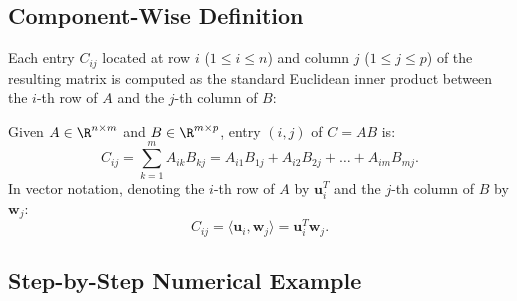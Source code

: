 \subsection{Component-Wise Definition}

Each entry $C_{ij}$ located at row $i$ ($1 \le i \le n$) and column $j$ ($1 \le j \le p$) of the resulting matrix is computed as the standard Euclidean inner product between the $i$-th row of $A$ and the $j$-th column of $B$:

\begin{definition}
Given $A \in \R^{n \times m}$ and $B \in \R^{m \times p}$, entry $(i, j)$ of $C = AB$ is:
\begin{equation}
    C_{ij} = \sum_{k=1}^m A_{ik} B_{kj} = A_{i1}B_{1j} + A_{i2}B_{2j} + \dots + A_{im}B_{mj}.
\end{equation}
In vector notation, denoting the $i$-th row of $A$ by $\mathbf{u}_i^T$ and the $j$-th column of $B$ by $\mathbf{w}_j$:
\begin{equation}
    C_{ij} = \langle \mathbf{u}_i, \mathbf{w}_j \rangle = \mathbf{u}_i^T \mathbf{w}_j.
\end{equation}
\end{definition}

\subsection{Step-by-Step Numerical Example}

